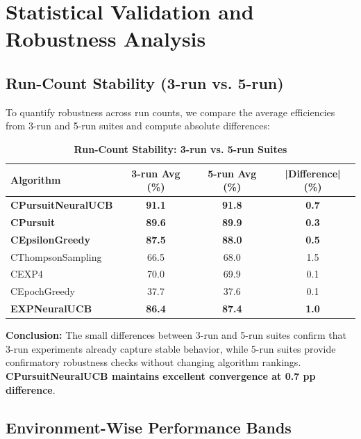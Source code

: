 \documentclass[12pt,a4paper]{article}
\newcommand{\success}[1]{\textcolor{successcolor}{\textbf{#1}}}
\newcommand{\legacy}[1]{\textcolor{legacycolor}{\textbf{#1}}}
\newcommand{\neural}[1]{\textcolor{neuralcolor}{\textbf{#1}}}
\begin{document}
\section{Statistical Validation and Robustness Analysis}

\subsection{Run-Count Stability (3-run vs. 5-run)}

To quantify robustness across run counts, we compare the average efficiencies from 3-run and 5-run suites and compute absolute differences:

\begin{table}[H]
\centering
\caption{\success{Run-Count Stability: 3-run vs. 5-run Suites}}
\begin{tabular}{|l|c|c|c|}
\hline
\textbf{Algorithm} & \textbf{3-run Avg (\%)} & \textbf{5-run Avg (\%)} & \textbf{|Difference| (\%)} \\
\hline
\hline
\neural{CPursuitNeuralUCB}  & \neural{91.1}     & \neural{91.8}     & \neural{0.7} \\
\success{CPursuit}        & \success{89.6} & \success{89.9} & \success{0.3} \\
\success{CEpsilonGreedy} & \success{87.5} & \success{88.0} & \success{0.5} \\
CThompsonSampling        & 66.5          & 68.0          & 1.5 \\
CEXP4                    & 70.0          & 69.9          & 0.1 \\
CEpochGreedy             & 37.7          & 37.6          & 0.1 \\
\legacy{EXPNeuralUCB}    & \legacy{86.4} & \legacy{87.4} & \legacy{1.0} \\
\hline
\end{tabular}
\end{table}

\textbf{Conclusion:} The small differences between 3-run and 5-run suites confirm that 3-run experiments already capture stable behavior, while 5-run suites provide confirmatory robustness checks without changing algorithm rankings. \neural{CPursuitNeuralUCB maintains excellent convergence at 0.7 pp difference}.

\subsection{Environment-Wise Performance Bands}
\end{document}
